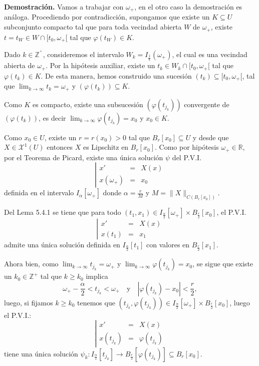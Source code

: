 \documentclass[11pt,a4paper]{article}
\theoremstyle{definition}
\theoremstyle{plain}
\theoremstyle{remark}
\begin{document}
	\noindent \textbf{Demostración.} Vamos a trabajar con $\omega_+$, en el otro caso la demostración es análoga. Procediendo por contradicción, supongamos que existe un $K \subseteq U$ subconjunto compacto tal que para toda vecindad abierta $W$ de $\omega_+$, existe $t = t_W \in W \cap [t_0, \omega_+[$ tal que $\varphi(t_W) \in K$.
	
	Dado $k \in \mathbb{Z}^^+$, consideremos el intervalo $W_k = I_{\frac{1}{k}}(\omega_+)$, el cual es una vecindad abierta de $\omega_+$. Por la hipótesis auxiliar, existe un $t_k \in W_k \cap [t_0, \omega_+[$ tal que $\varphi(t_k) \in K$. De esta manera, hemos construido una sucesión $(t_k) \subseteq [t_0, \omega_+[$, tal que $\lim_{k \to \infty} t_k = \omega_+$ y $(\varphi(t_k)) \subseteq K$.
	
	Como $K$ es compacto, existe una subsucesión $(\varphi(t_{j_k}))$ convergente de $(\varphi(t_k))$, es decir $\lim_{k \to \infty} \varphi(t_{j_k}) = x_0$ y $x_0 \in K$.
	
	Como $x_0 \in U$, existe un $r = r(x_0) > 0$ tal que $B_r[x_0] \subseteq U$ y desde que $X \in \mathcal{X}^1(U)$ entonces $X$ es Lipschitz en $B_r[x_0]$. Como por hipótesis $\omega_+ \in \mathbb{R}$, por el Teorema de Picard, existe una única solución $\psi$ del P.V.I.
	\begin{equation*}
		\left| 
		\begin{array}{lcl}
			x' &=& X(x) \\
			x(\omega_+) &=& x_0
		\end{array}
		\right.
	\end{equation*}
	definida en el intervalo $I_\alpha[\omega_+]$ donde $\alpha = \frac{r}{M}$ y $M = \|X\|_{C(B_r[x_0])}$.
	
	Del Lema 5.4.1 se tiene que para todo $(t_1, x_1) \in I_{\frac{\alpha}{2}}[\omega_+] \times B_{\frac{r}{2}}[x_0]$, el P.V.I.
	\begin{equation*}
		\left| 
		\begin{array}{lcl}
			x' &=& X(x) \\
			x(t_1) &=& x_1
		\end{array}
		\right.
	\end{equation*}
	admite una única solución definida en $I_{\frac{\alpha}{2}}[t_1]$ con valores en $B_{\frac{r}{2}}[x_1]$.
	
	Ahora bien, como $\lim_{k \to \infty} t_{j_k} = \omega_+$ y $\lim_{k \to \infty} \varphi(t_{j_k}) = x_0$, se sigue que existe un $k_0 \in \mathbb{Z}^+$ tal que $k \ge k_0$ implica
	\[
	\omega_+ - \frac{\alpha}{2} < t_{j_k} < \omega_+ \quad \text{y} \quad |\varphi(t_{j_k}) - x_0| < \frac{r}{2},
	\]
	luego, si fijamos $k \ge k_0$ tenemos que $(t_{j_k}, \varphi(t_{j_k})) \in I_{\frac{\alpha}{2}}[\omega_+] \times B_{\frac{r}{2}}[x_0]$, luego el P.V.I.:
	\begin{equation}\label{eq:523}
		\left| 
		\begin{array}{lcl}
			x' &=& X(x) \\
			x(t_{j_k}) &=& \varphi(t_{j_k})
		\end{array}
		\right.
	\end{equation}
	tiene una única solución $\psi_k : I_{\frac{\alpha}{2}}[t_{j_k}] \to B_{\frac{r}{2}}[\varphi(t_{j_k})] \subseteq B_r[x_0]$.
	
\end{document}
